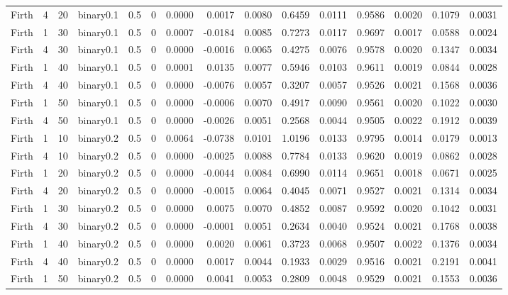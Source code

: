 \begin{longtable}{rrrrrrrrrrrrrrr}
  Firth & 4 & 20 & binary0.1 & 0.5 & 0 & 0.0000 & 0.0017 & 0.0080 & 0.6459 & 0.0111 & 0.9586 & 0.0020 & 0.1079 & 0.0031 \\ 
  Firth & 1 & 30 & binary0.1 & 0.5 & 0 & 0.0007 & -0.0184 & 0.0085 & 0.7273 & 0.0117 & 0.9697 & 0.0017 & 0.0588 & 0.0024 \\ 
  Firth & 4 & 30 & binary0.1 & 0.5 & 0 & 0.0000 & -0.0016 & 0.0065 & 0.4275 & 0.0076 & 0.9578 & 0.0020 & 0.1347 & 0.0034 \\ 
  Firth & 1 & 40 & binary0.1 & 0.5 & 0 & 0.0001 & 0.0135 & 0.0077 & 0.5946 & 0.0103 & 0.9611 & 0.0019 & 0.0844 & 0.0028 \\ 
  Firth & 4 & 40 & binary0.1 & 0.5 & 0 & 0.0000 & -0.0076 & 0.0057 & 0.3207 & 0.0057 & 0.9526 & 0.0021 & 0.1568 & 0.0036 \\ 
  Firth & 1 & 50 & binary0.1 & 0.5 & 0 & 0.0000 & -0.0006 & 0.0070 & 0.4917 & 0.0090 & 0.9561 & 0.0020 & 0.1022 & 0.0030 \\ 
  Firth & 4 & 50 & binary0.1 & 0.5 & 0 & 0.0000 & -0.0026 & 0.0051 & 0.2568 & 0.0044 & 0.9505 & 0.0022 & 0.1912 & 0.0039 \\ 
  Firth & 1 & 10 & binary0.2 & 0.5 & 0 & 0.0064 & -0.0738 & 0.0101 & 1.0196 & 0.0133 & 0.9795 & 0.0014 & 0.0179 & 0.0013 \\ 
  Firth & 4 & 10 & binary0.2 & 0.5 & 0 & 0.0000 & -0.0025 & 0.0088 & 0.7784 & 0.0133 & 0.9620 & 0.0019 & 0.0862 & 0.0028 \\ 
  Firth & 1 & 20 & binary0.2 & 0.5 & 0 & 0.0000 & -0.0044 & 0.0084 & 0.6990 & 0.0114 & 0.9651 & 0.0018 & 0.0671 & 0.0025 \\ 
  Firth & 4 & 20 & binary0.2 & 0.5 & 0 & 0.0000 & -0.0015 & 0.0064 & 0.4045 & 0.0071 & 0.9527 & 0.0021 & 0.1314 & 0.0034 \\ 
  Firth & 1 & 30 & binary0.2 & 0.5 & 0 & 0.0000 & 0.0075 & 0.0070 & 0.4852 & 0.0087 & 0.9592 & 0.0020 & 0.1042 & 0.0031 \\ 
  Firth & 4 & 30 & binary0.2 & 0.5 & 0 & 0.0000 & -0.0001 & 0.0051 & 0.2634 & 0.0040 & 0.9524 & 0.0021 & 0.1768 & 0.0038 \\ 
  Firth & 1 & 40 & binary0.2 & 0.5 & 0 & 0.0000 & 0.0020 & 0.0061 & 0.3723 & 0.0068 & 0.9507 & 0.0022 & 0.1376 & 0.0034 \\ 
  Firth & 4 & 40 & binary0.2 & 0.5 & 0 & 0.0000 & 0.0017 & 0.0044 & 0.1933 & 0.0029 & 0.9516 & 0.0021 & 0.2191 & 0.0041 \\ 
  Firth & 1 & 50 & binary0.2 & 0.5 & 0 & 0.0000 & 0.0041 & 0.0053 & 0.2809 & 0.0048 & 0.9529 & 0.0021 & 0.1553 & 0.0036 \\ 

\end{longtable}
